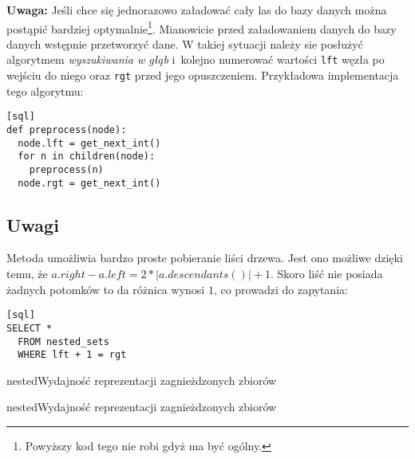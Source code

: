 \textbf{Uwaga:} Jeśli chce się jednorazowo załadować cały las do bazy danych można postąpić bardziej optymalnie\footnote{
    Powyższy kod tego nie robi gdyż ma być ogólny.
}.
Mianowicie przed załadowaniem danych do bazy danych wstępnie przetworzyć dane.
W takiej sytuacji należy sie posłużyć algorytmem \emph{wyszukiwania w głąb}
i~kolejno numerować wartości \texttt{lft} węzła po wejściu do niego oraz \texttt{rgt} przed jego opuszczeniem.
Przykładowa implementacja tego algorytmu:

\begin{verbatim}[sql]
def preprocess(node):
  node.lft = get_next_int()
  for n in children(node):
    preprocess(n)
  node.rgt = get_next_int()
\end{verbatim}







\subsection{Uwagi}

Metoda umożliwia bardzo proste pobieranie liści drzewa. 
Jest ono możliwe dzięki temu, że $a.right - a.left = 2 * |a.descendants()| + 1$. 
Skoro liść nie posiada żadnych potomków to da różnica wynosi $1$, co prowadzi do zapytania: 
\begin{verbatim}[sql]
SELECT *
  FROM nested_sets
  WHERE lft + 1 = rgt
\end{verbatim}



\begin{qxtab}{nested}{Wydajność reprezentacji zagnieżdzonych zbiorów}
\end{qxtab}

\begin{qxfig}{nested}{Wydajność reprezentacji zagnieżdzonych zbiorów}
\end{qxfig}

